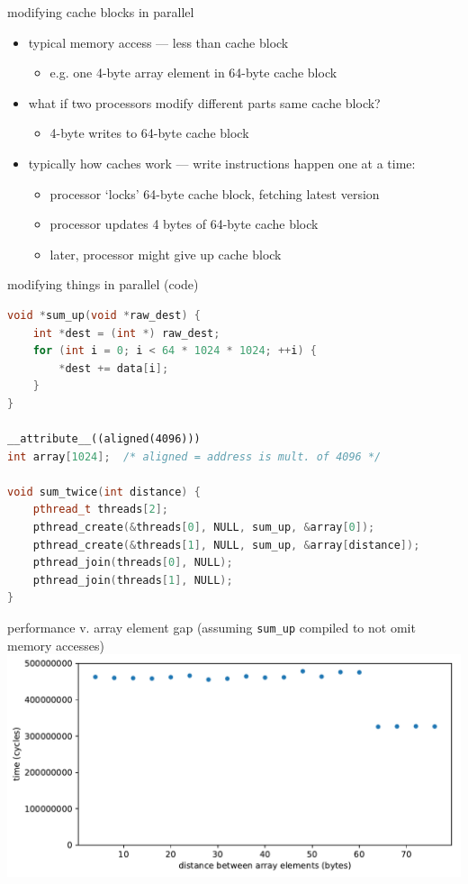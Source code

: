 \begin{frame}{modifying cache blocks in parallel}
\begin{itemize}
\item typical memory access --- less than cache block
    \begin{itemize}
    \item e.g. one 4-byte array element in 64-byte cache block
    \end{itemize}
\vspace{.5cm}
\item what if two processors modify different parts same cache block?   
    \begin{itemize}
    \item 4-byte writes to 64-byte cache block
    \end{itemize}
\item typically how caches work --- write instructions happen one at a time:
    \begin{itemize}
    \item processor `locks' 64-byte cache block, fetching latest version
    \item processor updates 4 bytes of 64-byte cache block
    \item later, processor might give up cache block
    \end{itemize}
\end{itemize}
\end{frame}

\begin{frame}[fragile,label=paralleModCode]{modifying things in parallel (code)}
\begin{lstlisting}[language=C++,style=smaller]
void *sum_up(void *raw_dest) {
    int *dest = (int *) raw_dest;
    for (int i = 0; i < 64 * 1024 * 1024; ++i) {
        *dest += data[i];
    }
}

__attribute__((aligned(4096))) 
int array[1024];  /* aligned = address is mult. of 4096 */

void sum_twice(int distance) {
    pthread_t threads[2];
    pthread_create(&threads[0], NULL, sum_up, &array[0]);
    pthread_create(&threads[1], NULL, sum_up, &array[distance]);
    pthread_join(threads[0], NULL);
    pthread_join(threads[1], NULL);
}
\end{lstlisting}
\end{frame}

\begin{frame}{performance v. array element gap}
(assuming \texttt{sum\_up} compiled to not omit memory accesses)
\includegraphics[width=\textwidth]{../sync/sum-up}
\end{frame}


